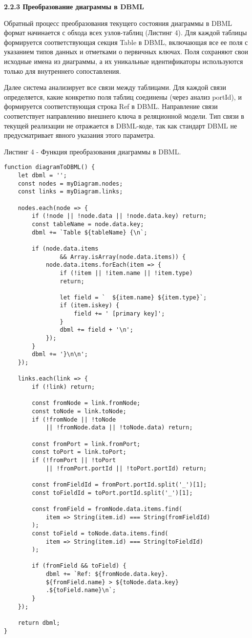\textbf{\large 2.2.3 Преобразование диаграммы в DBML}

Обратный процесс преобразования текущего состояния диаграммы в DBML формат начинается с обхода всех узлов-таблиц (Листинг 4). Для каждой таблицы формируется соответствующая секция Table в DBML, включающая все ее поля с указанием типов данных и отметками о первичных ключах. Поля сохраняют свои исходные имена из диаграммы, а их уникальные идентификаторы используются только для внутреннего сопоставления.

Далее система анализирует все связи между таблицами. Для каждой связи определяется, какие конкретно поля таблиц соединены (через анализ portId), и формируется соответствующая строка Ref в DBML. Направление связи соответствует направлению внешнего ключа в реляционной модели. Тип связи в текущей реализации не отражается в DBML-коде, так как стандарт DBML не предусматривает явного указания этого параметра.

Листинг 4 - Функция преобразования диаграммы в DBML.
\begin{lstlisting}[frame=single]
function diagramToDBML() {
    let dbml = '';
    const nodes = myDiagram.nodes;
    const links = myDiagram.links;

    nodes.each(node => {
        if (!node || !node.data || !node.data.key) return;
        const tableName = node.data.key;
        dbml += `Table ${tableName} {\n`;

        if (node.data.items
                && Array.isArray(node.data.items)) {
            node.data.items.forEach(item => {
                if (!item || !item.name || !item.type) 
                return;

                let field = `  ${item.name} ${item.type}`;
                if (item.iskey) {
                    field += ' [primary key]';
                }
                dbml += field + '\n';
            });
        }
        dbml += '}\n\n';
    });

    links.each(link => {
        if (!link) return;

        const fromNode = link.fromNode;
        const toNode = link.toNode;
        if (!fromNode || !toNode 
            || !fromNode.data || !toNode.data) return;

        const fromPort = link.fromPort;
        const toPort = link.toPort;
        if (!fromPort || !toPort 
            || !fromPort.portId || !toPort.portId) return;

        const fromFieldId = fromPort.portId.split('_')[1];
        const toFieldId = toPort.portId.split('_')[1];

        const fromField = fromNode.data.items.find(
            item => String(item.id) === String(fromFieldId)
        );
        const toField = toNode.data.items.find(
            item => String(item.id) === String(toFieldId)
        );

        if (fromField && toField) {
            dbml += `Ref: ${fromNode.data.key}.
            ${fromField.name} > ${toNode.data.key}
            .${toField.name}\n`;
        }
    });

    return dbml;
}
\end{lstlisting}

